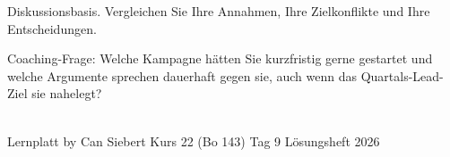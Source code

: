 \documentclass[11pt,a4paper,oneside]{article}
\begin{document}
\noindent Diskussionsbasis. Vergleichen Sie Ihre Annahmen, Ihre Zielkonflikte und Ihre Entscheidungen.

\medskip
\begin{infobox}
Coaching-Frage: Welche Kampagne hätten Sie kurzfristig gerne gestartet \textendash{} und welche Argumente sprechen dauerhaft gegen sie, auch wenn das Quartals-Lead-Ziel sie nahelegt?
\end{infobox}

\vspace{1cm}
\noindent{\color{lpAccent}\rule{\linewidth}{0.6pt}}\\[4pt]
{\footnotesize\sffamily\color{lpGray}Lernplatt \textperiodcentered{} by Can Siebert \textperiodcentered{} Kurs 22 (Bo 143) \textperiodcentered{} Tag 9 \textperiodcentered{} Lösungsheft \textperiodcentered{} \textcopyright{} 2026}
\end{document}
